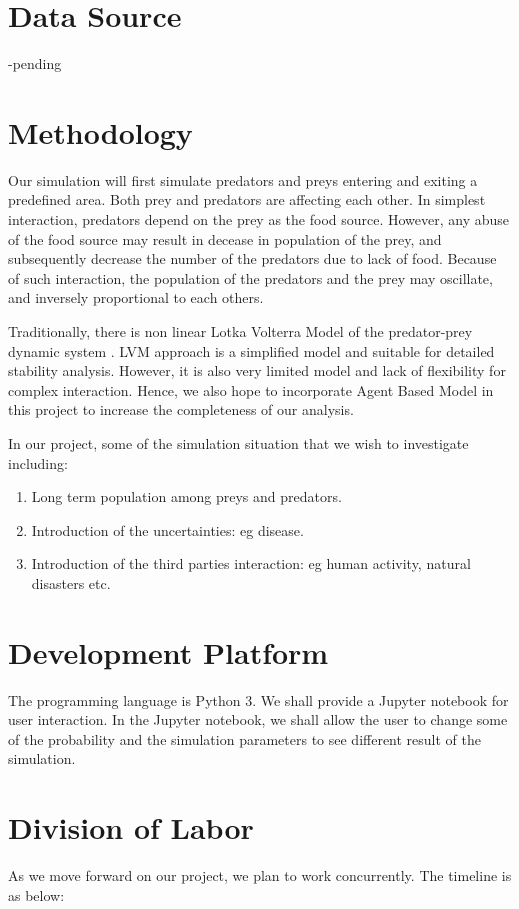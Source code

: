\documentclass{article}
\begin{document}
\begin{normalsize}
		\section{Data Source}
		-pending
		
		\section{Methodology}
		Our simulation will first simulate predators and preys entering and exiting a predefined area. Both prey and predators are affecting each other. In simplest interaction, predators depend on the prey as the food source. However, any abuse of the food source may result in decease in population of the prey, and subsequently decrease the number of the predators due to lack of food. Because of such interaction, the population of the predators and the prey may oscillate, and inversely proportional to each others. 
		
		Traditionally, there is non linear Lotka Volterra Model of the predator-prey dynamic system \cite{inproceedings, 1102729}. LVM approach is a simplified model and suitable for detailed stability analysis. However, it is also very limited model and lack of flexibility for complex interaction. Hence, we also hope to incorporate Agent Based Model \cite{Hodzic} in this project to increase the completeness of our analysis. 
		
		In our project, some of the simulation situation that we wish to investigate including:
		\begin{enumerate}
			\item Long term population among preys and predators.
			\item Introduction of the uncertainties: eg disease.
			\item Introduction of the third parties interaction: eg human activity, natural disasters etc.
		\end{enumerate}
		
		\section{Development Platform}
		The programming language is Python 3. We shall provide a Jupyter notebook for user interaction.
		In the Jupyter notebook, we shall allow the user to change some of the probability and the simulation parameters to see different result of the simulation.
		
		\section{Division of Labor}
		As we move forward on our project, we plan to work concurrently. The timeline is as below:
		

\end{normalsize}
\end{document}
